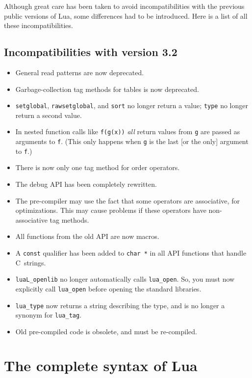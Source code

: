 \documentclass[11pt]{article}
\newcommand{\Index}[1]{#1\index{#1}}
\begin{document}
Although great care has been taken to avoid incompatibilities with
the previous public versions of Lua,
some differences had to be introduced.
Here is a list of all these incompatibilities.

\subsection*{Incompatibilities with \Index{version 3.2}}
\begin{itemize}

\item
General read patterns are now deprecated.
\item
Garbage-collection tag methods for tables is now deprecated.
\item
\verb|setglobal|, \verb|rawsetglobal|, and \verb|sort| no longer return a value;
\verb|type| no longer return a second value.
\item
In nested function calls like \verb|f(g(x))|
\emph{all} return values from \verb|g| are passed as arguments to \verb|f|.
(This only happens when \verb|g| is the last
[or the only] argument to \verb|f|.)
\item
There is now only one tag method for order operators.
\item
The debug API has been completely rewritten.
\item
The pre-compiler may use the fact that some operators are associative,
for optimizations.
This may cause problems if these operators
have non-associative tag methods.
\item
All functions from the old API are now macros.
\item
A \verb|const| qualifier has been added to \verb|char *|
in all API functions that handle C~strings.
\item
\verb|luaL_openlib| no longer automatically calls \verb|lua_open|.
So,
you must now explicitly call \verb|lua_open| before opening
the standard libraries.
\item
\verb|lua_type| now returns a string describing the type,
and is no longer a synonym for \verb|lua_tag|.
\item Old pre-compiled code is obsolete, and must be re-compiled.

\end{itemize}

\section*{The complete syntax of Lua}
\end{document}
